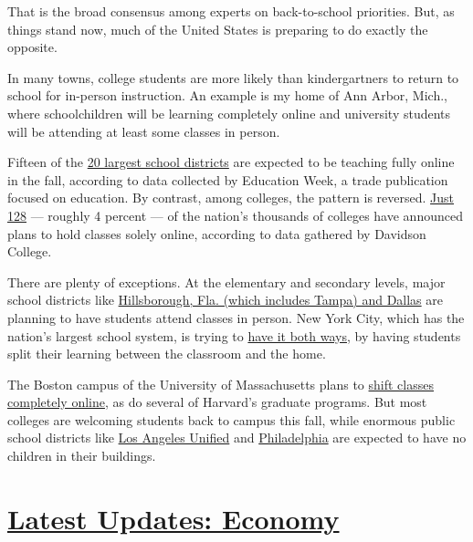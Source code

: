 That is the broad consensus among experts on back-to-school priorities.
But, as things stand now, much of the United States is preparing to do
exactly the opposite.

In many towns, college students are more likely than kindergartners to
return to school for in-person instruction. An example is my home of Ann
Arbor, Mich., where schoolchildren will be learning completely online
and university students will be attending at least some classes in
person.

Fifteen of the
\href{https://www.edweek.org/ew/section/multimedia/school-districts-reopening-plans-a-snapshot.html}{20
largest school districts} are expected to be teaching fully online in
the fall, according to data collected by Education Week, a trade
publication focused on education. By contrast, among colleges, the
pattern is reversed.
\href{https://collegecrisis.shinyapps.io/dashboard/}{Just 128} ---
roughly 4 percent --- of the nation's thousands of colleges have
announced plans to hold classes solely online, according to data
gathered by Davidson College.

There are plenty of exceptions. At the elementary and secondary levels,
major school districts like
\href{https://www.edweek.org/ew/section/multimedia/school-districts-reopening-plans-a-snapshot.html}{Hillsborough,
Fla. (which includes Tampa) and Dallas} are planning to have students
attend classes in person. New York City, which has the nation's largest
school system, is trying to
\href{https://www.schools.nyc.gov/school-year-20-21/return-to-school-2020/welcome-to-the-2020-2021-school-year}{have
it both ways}, by having students split their learning between the
classroom and the home.

The Boston campus of the University of Massachusetts plans to
\href{https://www.masslive.com/news/2020/07/here-are-the-fall-reopening-plans-for-the-25-largest-colleges-in-mass.html}{shift
classes completely online}, as do several of Harvard's graduate
programs. But most colleges are welcoming students back to campus this
fall, while enormous public school districts like
\href{https://achieve.lausd.net/site/default.aspx?PageType=3\&DomainID=4\&ModuleInstanceID=4466\&ViewID=6446EE88-D30C-497E-9316-3F8874B3E108\&RenderLoc=0\&FlexDataID=91406\&PageID=1}{Los
Angeles Unified} and
\href{https://www.philasd.org/coronavirus/schoolstart2020/}{Philadelphia}
are expected to have no children in their buildings.

\hypertarget{latest-updates-economy}{%
\section{\texorpdfstring{\href{https://www.nytimes3xbfgragh.onion/live/2020/08/03/business/stock-market-today-coronavirus?action=click\&pgtype=Article\&state=default\&region=MAIN_CONTENT_1\&context=storylines_live_updates}{Latest
Updates:
Economy}}{Latest Updates: Economy}}\label{latest-updates-economy}}

